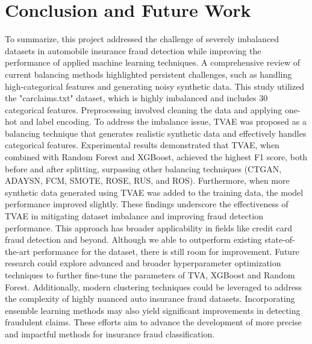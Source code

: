 \documentclass[twoside,11pt]{article}
\begin{document}
\section{Conclusion and Future Work}  \label{sec:conclusion}
To summarize, this project addressed the challenge of severely imbalanced datasets in automobile insurance fraud detection while improving the performance of applied machine learning techniques. A comprehensive review of current balancing methods highlighted persistent challenges, such as handling high-categorical features and generating noisy synthetic data. This study utilized the "carclaims.txt" dataset, which is highly imbalanced and includes 30 categorical features. Preprocessing involved cleaning the data and applying one-hot and label encoding. To address the imbalance issue, TVAE was proposed as a balancing technique that generates realistic synthetic data and effectively handles categorical features. Experimental results demonstrated that TVAE, when combined with Random Forest and XGBoost, achieved the highest F1 score, both before and after splitting, surpassing other balancing techniques (CTGAN, ADAYSN, FCM, SMOTE, ROSE, RUS, and ROS). Furthermore, when more synthetic data generated using TVAE was added to the training data, the model performance improved slightly. These findings underscore the effectiveness of TVAE in mitigating dataset imbalance and improving fraud detection performance. This approach has broader applicability in fields like credit card fraud detection and beyond.
Although we able to outperform existing state-of-the-art performance for the dataset, there is still room for improvement. Future research could explore advanced and broader hyperparameter optimization techniques to further fine-tune the parameters of TVA, XGBoost and Random Forest. Additionally, modern clustering techniques could be leveraged to address the complexity of highly nuanced auto insurance fraud datasets. Incorporating ensemble learning methods may also yield significant improvements in detecting fraudulent claims. These efforts aim to advance the development of more precise and impactful methods for insurance fraud classification.



\vskip 0.2in

\end{document}

